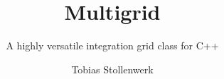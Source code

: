 \documentclass[a4paper]{scrreprt}
\begin{document}
\title{Multigrid}
\subtitle{A highly versatile integration grid class for C++}
\author{Tobias Stollenwerk}
\maketitle

\tableofcontents













\printindex
\end{document}

